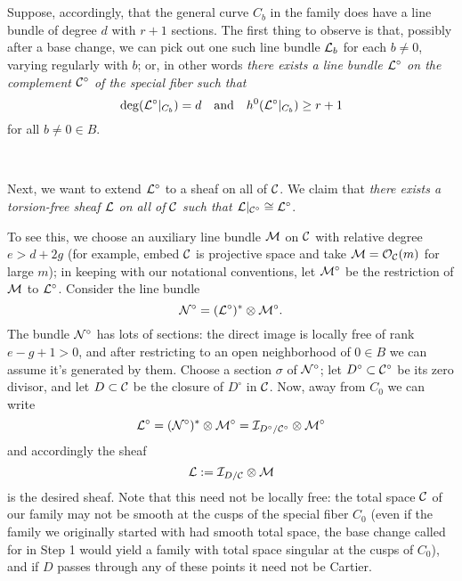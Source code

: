 \


\


Suppose, accordingly, that the general curve $C_b$ in the family does have a line bundle  of degree $d$ with $r+1$ sections. The first thing to observe is that, possibly after a base change, we can pick out one such line bundle $\cL_b$ for each $b \neq 0$, varying regularly with $b$; or, in other words \emph{there exists a  line bundle $\cL^\circ$ on the complement $\cC^\circ$ of the special fiber such that}
$$
\deg(\cL^\circ|_{C_b}) = d \quad \text{and} \quad h^0(\cL^\circ|_{C_b}) \geq r+1
$$
for all $b \neq 0 \in B$. 

\


Next, we want to extend $\cL^\circ$ to a sheaf on all of $\cC$. We claim that \emph{there exists a torsion-free sheaf $\cL$ on all of $\cC$ such that $\cL|_{\cC^\circ} \cong \cL^\circ$}.

To see this, we choose an auxiliary line bundle $\cM$ on $\cC$ with relative degree $e > d + 2g$ (for example, embed $\cC$ is projective space and take $\cM = \cO_{\cC}(m)$ for large $m$); in keeping with our notational conventions, let $\cM^\circ$ be the restriction of $\cM$ to $\cL^\circ$. Consider the line bundle 
$$
\cN^\circ = (\cL^\circ)^* \otimes \cM^\circ.
$$
The bundle $\cN^\circ$ has lots of sections: the direct image is locally free of rank $e-g+1 > 0$, and after restricting to an open neighborhood of $0 \in B$ we can assume it's generated by them. Choose a section $\sigma$ of $\cN^\circ$; let $D^\circ \subset \cC^\circ$ be its zero divisor, and let $D \subset \cC$ be the closure of $D^\circ$ in $\cC$. Now, away from $C_0$ we can write
$$
\cL^\circ = (\cN^\circ)^* \otimes \cM^\circ = \cI_{D^\circ/\cC^\circ} \otimes \cM^\circ
$$
and accordingly the sheaf
$$
\cL := \cI_{D/\cC} \otimes \cM
$$
is the desired sheaf. Note that this need not be locally free: the total space $\cC$ of our family may not be smooth at the cusps of the special fiber $C_0$ (even if the family we originally started with had smooth total space, the base change called for in Step 1 would yield a family with  total space singular at the cusps of $C_0$), and if $D$ passes through any of these points it need not be Cartier.

